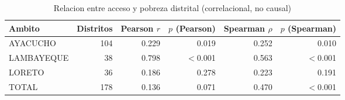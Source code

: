 \begin{table}[htbp]
\caption{Relacion entre acceso y pobreza distrital (correlacional, no causal)}
\label{tab:pobreza}
\begin{tabular}{lrrrrr}
\toprule
Ambito & Distritos & Pearson $r$ & $p$ (Pearson) & Spearman $\rho$ & $p$ (Spearman) \\
\midrule
AYACUCHO & 104 & 0.229 & 0.019 & 0.252 & 0.010 \\
LAMBAYEQUE & 38 & 0.798 & $<$0.001 & 0.563 & $<$0.001 \\
LORETO & 36 & 0.186 & 0.278 & 0.223 & 0.191 \\
TOTAL & 178 & 0.136 & 0.071 & 0.470 & $<$0.001 \\
\bottomrule
\end{tabular}
\end{table}

